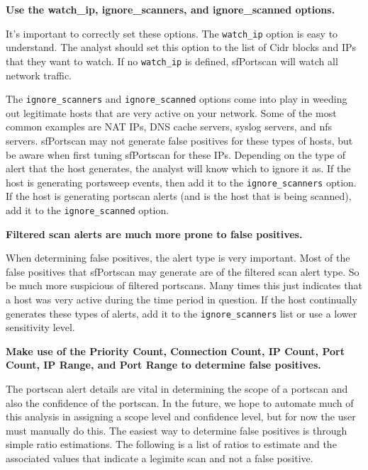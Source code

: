 \documentclass[english]{report}
\newcounter{slistnum}
\newenvironment{slist}
{ \begin{list}{ {\bf \arabic{slistnum}.} }{\usecounter{slistnum} } }
{ \end{list} }
\begin{document}
\begin{slist}

\item \textbf{Use the watch\_ip, ignore\_scanners, and ignore\_scanned options.}
  
It's important to correctly set these options.  The \texttt{watch\_ip} option
is easy to understand.  The analyst should set this option to the list of Cidr
blocks and IPs that they want to watch.  If no \texttt{watch\_ip} is defined,
sfPortscan will watch all network traffic.
     
The \texttt{ignore\_scanners} and \texttt{ignore\_scanned} options come into
play in weeding out legitimate hosts that are very active on your network.
Some of the most common examples are NAT IPs, DNS cache servers, syslog
servers, and nfs servers.  sfPortscan may not generate false positives for
these types of hosts, but be aware when first tuning sfPortscan for these IPs.
Depending on the type of alert that the host generates, the analyst will know
which to ignore it as.  If the host is generating portsweep events, then add it
to the \texttt{ignore\_scanners} option.  If the host is generating portscan
alerts (and is the host that is being scanned), add it to the
\texttt{ignore\_scanned} option.
  
\item \textbf{Filtered scan alerts are much more prone to false positives.}
  
When determining false positives, the alert type is very important.  Most of
the false positives that sfPortscan may generate are of the filtered scan alert
type.  So be much more suspicious of filtered portscans.  Many times this just
indicates that a host was very active during the time period in question.  If
the host continually generates these types of alerts, add it to the
\texttt{ignore\_scanners} list or use a lower sensitivity level.
     
\item \textbf{Make use of the Priority Count, Connection Count, IP Count, Port
Count, IP Range, and Port Range to determine false positives.}
     
The portscan alert details are vital in determining the scope of a portscan and
also the confidence of the portscan.  In the future, we hope to automate much
of this analysis in assigning a scope level and confidence level, but for now
the user must manually do this.  The easiest way to determine false positives
is through simple ratio estimations.  The following is a list of ratios to
estimate and the associated values that indicate a legimite scan and not a
false positive.
     

\end{slist}
\end{document}
